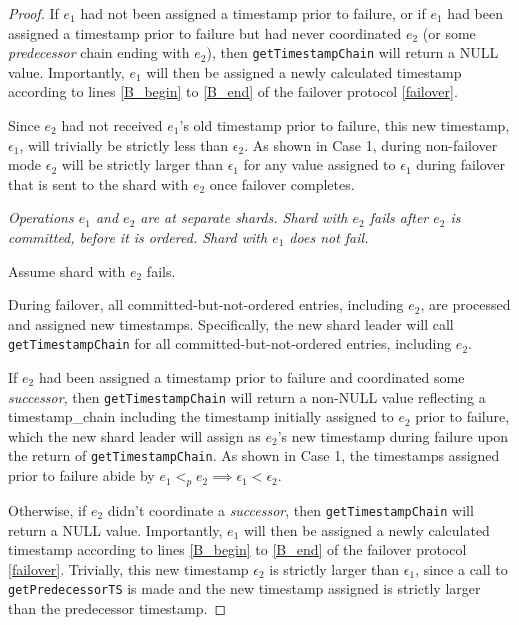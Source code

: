 \begin{proof}
If $e_1$ had not been assigned a timestamp prior to failure, or if $e_1$ had been assigned a timestamp prior to failure but had never coordinated $e_2$ (or some \textit{predecessor} chain ending with $e_2$), then \texttt{getTimestampChain} will return a NULL value. Importantly, $e_1$ will then be assigned a newly calculated timestamp according to lines \ref{B_begin} to \ref{B_end} of the failover protocol \ref{failover}.

Since $e_2$ had not received $e_1$'s old timestamp prior to failure, this new timestamp, $\epsilon_1$, will trivially be strictly less than $\epsilon_2$. As shown in Case 1, during non-failover mode $\epsilon_2$ will be strictly larger than $\epsilon_1$ for any value assigned to $\epsilon_1$ during failover that is sent to the shard with $e_2$ once failover completes.

 \textit{Operations $e_1$ and $e_2$ are at separate shards. Shard with $e_2$ fails after $e_2$ is \textit{committed}, before it is \textit{ordered}. Shard with $e_1$ does not fail.}

Assume shard with $e_2$ fails.

During failover, all committed-but-not-ordered entries, including $e_2$, are processed and assigned new timestamps. Specifically, the new shard leader will call \texttt{getTimestampChain} for all committed-but-not-ordered entries, including $e_2$.

If $e_2$ had been assigned a timestamp prior to failure and coordinated some \textit{successor}, then \texttt{getTimestampChain} will return a non-NULL value reflecting a timestamp\_chain including the timestamp initially assigned to $e_2$ prior to failure, which the new shard leader will assign as $e_2$'s new timestamp during failure upon the return of \texttt{getTimestampChain}. As shown in Case 1, the timestamps assigned prior to failure abide by $e_1 <_p e_2 \implies \epsilon_1 < \epsilon_2$.

Otherwise, if $e_2$ didn't coordinate a \textit{successor}, then \texttt{getTimestampChain} will return a NULL value. Importantly, $e_1$ will then be assigned a newly calculated timestamp according to lines \ref{B_begin} to \ref{B_end} of the failover protocol \ref{failover}. Trivially, this new timestamp $\epsilon_2$ is strictly larger than $\epsilon_1$, since a call to \texttt{getPredecessorTS} is made and the new timestamp assigned is strictly larger than the predecessor timestamp.


\end{proof}
